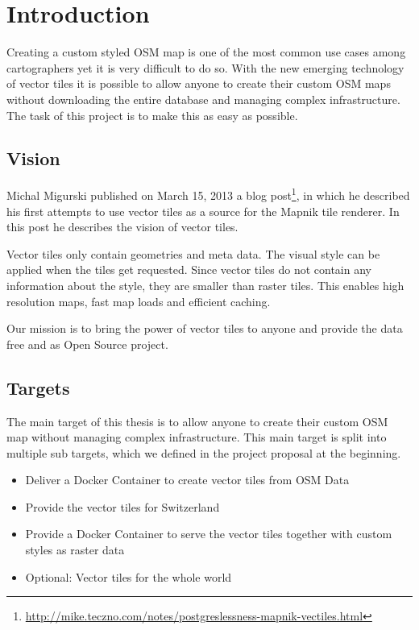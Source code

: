 \chapter{Introduction}


Creating a custom styled OSM map is one of the most common use cases
among cartographers yet it is very difficult to do so. With the new
emerging technology of vector tiles it is possible to allow anyone to
create their custom OSM maps without downloading the entire database and
managing complex infrastructure. The task of this project is to make
this as easy as possible.


\section{Vision}

Michal Migurski published on March 15, 2013 a blog
post\footnote{\url{http://mike.teczno.com/notes/postgreslessness-mapnik-vectiles.html}},
in which he described his first attempts to use vector tiles as a source
for the Mapnik tile renderer. In this post he describes the vision of
vector tiles.

Vector tiles only contain geometries and meta data. The visual style can
be applied when the tiles get requested. Since vector tiles do not
contain any information about the style, they are smaller than raster
tiles. This enables high resolution maps, fast map loads and efficient
caching.

Our mission is to bring the power of vector tiles to anyone and provide
the data free and as Open Source project.


\section{Targets}\label{targets}

The main target of this thesis is to allow anyone to create their custom
OSM map without managing complex infrastructure. This main target is
split into multiple sub targets, which we defined in the project proposal
at the beginning.

\begin{itemize}
\item
  Deliver a Docker Container to create vector tiles from OSM Data
\item
  Provide the vector tiles for Switzerland
\item
  Provide a Docker Container to serve the vector tiles together with
  custom styles as raster data
\item
  Optional: Vector tiles for the whole world
\end{itemize}

